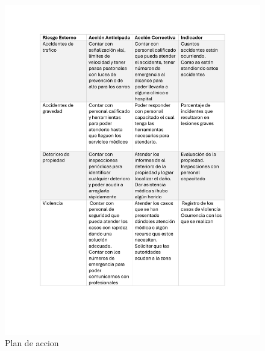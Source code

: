 \begin{figure}[H]
    \centering
    \includegraphics[scale=0.3]{13/img/planDeAccionDos.pdf}
    \caption{Plan de accion}
\end{figure}
% 
% 
